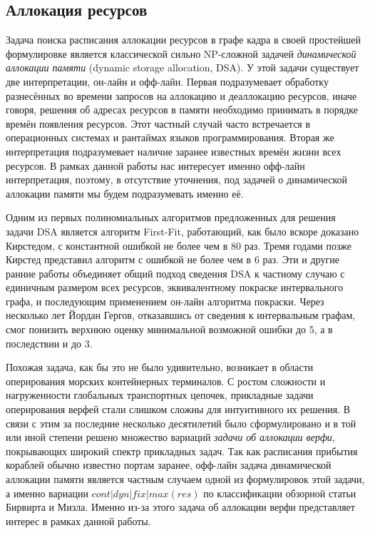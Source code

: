 \subsection{Аллокация ресурсов}
Задача поиска расписания аллокации ресурсов в графе кадра в своей простейшей формулировке является классической сильно NP-сложной\cite{DSAnpcomplete} задачей \textit{динамической аллокации памяти} (dynamic storage allocation, DSA\cite[с. 226]{10.5555/574848}). У этой задачи существует две интерпретации, он-лайн и офф-лайн. Первая подразумевает обработку разнесённых во времени запросов на аллокацию и деаллокацию ресурсов, иначе говоря, решения об адресах ресурсов в памяти необходимо принимать в порядке времён появления ресурсов. Этот частный случай часто встречается в операционных системах и рантаймах языков программирования. Вторая же интерпретация подразумевает наличие заранее известных времён жизни всех ресурсов. В рамках данной работы нас интересует именно офф-лайн интерпретация, поэтому, в отсутствие уточнения, под задачей о динамической аллокации памяти мы будем подразумевать именно её.

Одним из первых полиномиальных алгоритмов предложенных для решения задачи DSA является алгоритм First-Fit\cite{chrobak_packing_1988}, работающий, как было вскоре доказано Кирстедом, с константной ошибкой не более чем в 80 раз\cite{kierstead_linearity_1988}. Тремя годами позже Кирстед представил алгоритм с ошибкой не более чем в 6 раз\cite{kierstead_polynomial_1991}. Эти и другие ранние работы объединяет общий подход сведения DSA к частному случаю с единичным размером всех ресурсов, эквивалентному покраске интервального графа, и последующим применением он-лайн алгоритма покраски. Через несколько лет Йордан Гергов, отказавшись от сведения к интервальным графам, смог понизить верхнюю оценку минимальной возможной ошибки до 5\cite{gergov_approximation_1996}, а в последствии и до 3\cite{gergov_algorithms_1999}. 


Похожая задача, как бы это не было удивительно, возникает в области оперирования морских контейнерных терминалов. С ростом сложности и нагруженности глобальных транспортных цепочек, прикладные задачи оперирования верфей стали слишком сложны для интуитивного их решения. В связи с этим за последние несколько десятилетий было сформулировано и в той или иной степени решено множество вариаций \textit{задачи об аллокации верфи}, покрывающих широкий спектр прикладных задач. Так как расписания прибытия кораблей обычно известно портам заранее, офф-лайн задача динамической аллокации памяти является частным случаем одной из формулировок этой задачи, а именно вариации $cont|dyn|fix|max(res)$ по классификации обзорной статьи Бирвирта и Мизла\cite{BIERWIRTH2010615}. Именно из-за этого задача об аллокации верфи представляет интерес в рамках данной работы.

